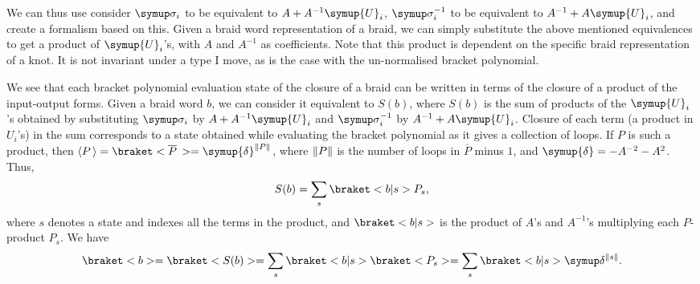 We can thus use consider \(\sigmaa_i\) to be equivalent to \(A + A^{-1}\symup{U}_i\), \(\sigmaa^{-1}_i\) to be equivalent to \(A^{-1} + A\symup{U}_i\), and create a formalism based on this. Given a braid word representation of a braid, we can simply substitute the above mentioned equivalences to get a product of \(\symup{U}_i\)'s, with \(A\) and \(A^{-1}\) as coefficients. Note that this product is dependent on the specific braid representation of a knot. It is not invariant under a type I move, as is the case with the un-normalised bracket polynomial.

We see that each bracket polynomial evaluation state of the closure of a braid can be written in terms of the closure of a product of the input-output forms. Given a braid word \(b\), we can consider it equivalent to \(S(b)\), where \(S(b)\) is the sum of products of the \(\symup{U}_i\)'s obtained by substituting \(\sigmaa_i\) by \(A + A^{-1}\symup{U}_i\) and \(\sigmaa_i^{-1}\) by \(A^{-1} + A\symup{U}_i\). Closure of each term (a product in \(U_i\)'s) in the sum corresponds to a state obtained while evaluating the bracket polynomial as it gives a collection of loops. If \(P\) is such a product, then \(\left\langle P\,\right\rangle = \braket<\overline{P}\,> = \symup{\delta}^{\norm{P}}\), where \(\lVert P\rVert\) is the number of loops in \(\overline{P}\) minus \(1\), and \(\symup{\delta} = -A^{-2} - A^2\). Thus, \[S(b) = \sum_s \braket<b|s> P_s,\] where \(s\) denotes a state and indexes all the terms in the product, and \(\braket<b|s>\) is the product of \(A\)'s and \(A^{-1}\)'s multiplying each \(P\)-product \(P_s\). We have \[\braket<b> = \braket<S(b)> = \sum_s \braket<b|s> \braket<P_s> = \sum_s \braket<b|s> \updelta^{\norm{s}}.\]

